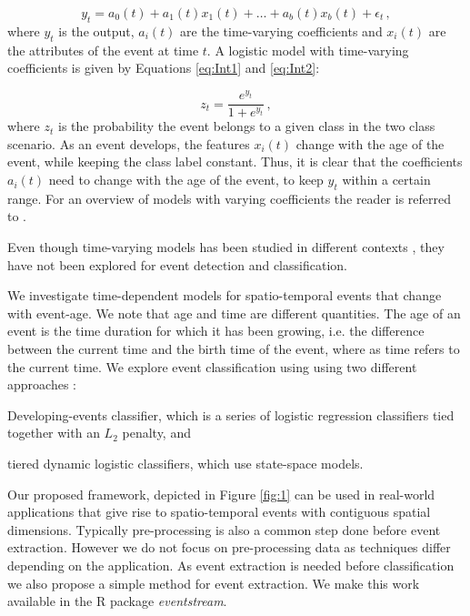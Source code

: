 \documentclass[11pt]{article}
\begin{document}
	\begin{equation}\label{eq:Int1}
	y_t = a_0(t)  + a_1(t) x_1(t) + \ldots + a_b(t)x_b(t) + \epsilon_t \, , 
	\end{equation} 
	\noindent
	where $y_t$ is the output, $a_i(t)$ are the time-varying coefficients and $x_i(t)$ are the attributes of the event at time $t$. A logistic model with time-varying coefficients is given by Equations \eqref{eq:Int1} and  \eqref{eq:Int2}:
	
	\begin{equation}\label{eq:Int2}
	z_t = \frac{e^{y_t}}{1 + e^{y_t}} \, ,
	\end{equation} 
	\noindent
	where $z_t$ is the probability the event belongs to a given class in the two class scenario. As an event develops, the features $x_i(t)$ change with the age of the event, while keeping the class label constant. Thus, it is clear that the coefficients $a_i(t)$ need to change with the age of the event, to keep $y_t$ within a certain range. For an overview of models with varying coefficients the reader is referred to \cite{hastie1993varying}. 
	
	Even though time-varying models has been studied in different contexts \cite{harvey1989time, wang1998cluster, hoover1998nonparametric}, they have not been explored for event detection and classification. 
	
	We investigate time-dependent models for spatio-temporal events that change with event-age. We note that age and time are different quantities. The age of an event is the time duration for which it has been growing, i.e. the difference between the current time and the birth time of the event, where as time refers to the current time.  We explore event classification using using two different approaches : \begin{inparaenum} \item Developing-events classifier, which is a series of logistic regression classifiers tied together with an $L_2$ penalty, and \item tiered dynamic logistic classifiers, which use  state-space models.  \end{inparaenum} 
	
	Our proposed framework, depicted in Figure \ref{fig:1}  can be used in real-world applications that give rise to spatio-temporal events with contiguous spatial dimensions. Typically pre-processing is also a common step done before event extraction. However we do not focus on pre-processing data as techniques differ depending on the application.  As event extraction is needed before classification  we also propose a simple method for event extraction. We make this work available in the R package {\it eventstream}. 
	
\end{document}

